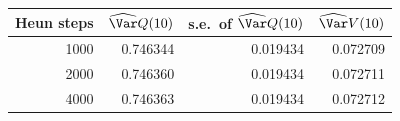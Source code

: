 \begin{tabular}{rrrr}\toprule
Heun steps & $\widehat{\Var}Q(10)$ & s.e.\ of $\widehat{\Var}Q(10)$ & $\widehat{\Var}V(10)$\\\midrule
1000 & 0.746344 & 0.019434 & 0.072709\\
2000 & 0.746360 & 0.019434 & 0.072711\\
4000 & 0.746363 & 0.019434 & 0.072712\\
\bottomrule\end{tabular}
